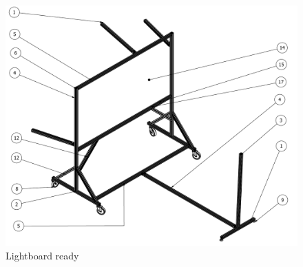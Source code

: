 \documentclass[a4paper]{jpconf}
\begin{document}
	
	
	\begin{figure}
		\centering
		\includegraphics[width=1\linewidth]{frame1.pdf}
		\caption{Lightboard ready}
		\label{fig:Finalprodotype}
	\end{figure}
	
\end{document}
